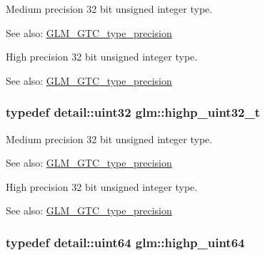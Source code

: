 Medium precision 32 bit unsigned integer type. \begin{Desc}
\item[See also:]\hyperlink{group__gtc__type__precision}{GLM\_\-GTC\_\-type\_\-precision}\end{Desc}
High precision 32 bit unsigned integer type. \begin{Desc}
\item[See also:]\hyperlink{group__gtc__type__precision}{GLM\_\-GTC\_\-type\_\-precision} \end{Desc}
\hypertarget{group__gtc__type__precision_g8eb85ad460079c63b68866ae34637bda}{
\subsubsection[highp\_\-uint32\_\-t]{\setlength{\rightskip}{0pt plus 5cm}typedef detail::uint32 {\bf glm::highp\_\-uint32\_\-t}}}
\label{group__gtc__type__precision_g8eb85ad460079c63b68866ae34637bda}


Medium precision 32 bit unsigned integer type. \begin{Desc}
\item[See also:]\hyperlink{group__gtc__type__precision}{GLM\_\-GTC\_\-type\_\-precision}\end{Desc}
High precision 32 bit unsigned integer type. \begin{Desc}
\item[See also:]\hyperlink{group__gtc__type__precision}{GLM\_\-GTC\_\-type\_\-precision} \end{Desc}
\hypertarget{group__gtc__type__precision_g8079c653e20cda03d34b99de629a7b09}{
\subsubsection[highp\_\-uint64]{\setlength{\rightskip}{0pt plus 5cm}typedef detail::uint64 {\bf glm::highp\_\-uint64}}}
\label{group__gtc__type__precision_g8079c653e20cda03d34b99de629a7b09}


